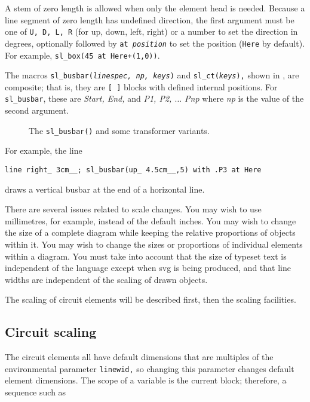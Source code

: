 A stem of zero length is allowed when only the element head is needed.
Because a line segment of zero length has undefined direction, the
first argument must be one of {\tt U, D, L, R} (for up, down, left, right)
or a number to set the direction in degrees, optionally followed by
{\tt at {\sl position}} to set the position ({\tt Here} by default).
For example, {\tt sl\_box(45 at Here+(1,0))}.

The macros {\tt sl\_busbar({\sl linespec, np, keys})} and 
{\tt sl\_ct({\sl keys}),}
shown in ,
are composite; that is, they are {\tt [ ]} blocks with defined
internal positions. For {\tt sl\_busbar}, these are
{\sl Start, End,} and
{\sl P1, P2, $\ldots$ Pnp} where {\sl np} is the value of the
second argument.
\begin{figure}[H]
   \vspace*{-\baselineskip}
   \SLDComposite
   \caption{The {\tt sl\_busbar()} and some transformer variants.}
   \label{SLDComposite}
   \end{figure}

For example, the line
\par
{\tt line right\_ 3cm\_\_; sl\_busbar(up\_ 4.5cm\_\_,5) with .P3 at Here}
\vspace*{\parsep}
\par
\noindent%
 draws a vertical busbar at the end of a horizontal line.


There are several issues related to scale changes.  You may wish to use
millimetres, for example, instead of the default inches.  You may wish
to change the size of a complete diagram while keeping the relative
proportions of objects within it.  You may wish to change the sizes
or proportions of individual elements within a diagram.  You must take
into account that the size of typeset text is independent of the \pic
language except when svg is being produced, and that line widths are
independent of the scaling of drawn objects.

The scaling of circuit elements will be described first, then
the \pic scaling facilities.

\subsection{Circuit scaling\label{Circuitscaling:}}
The circuit elements all have default dimensions
that are multiples of the \pic environmental parameter {\tt linewid,}
so changing this parameter changes default element dimensions.
The scope of a \pic variable is the current block; therefore, a sequence
such as

